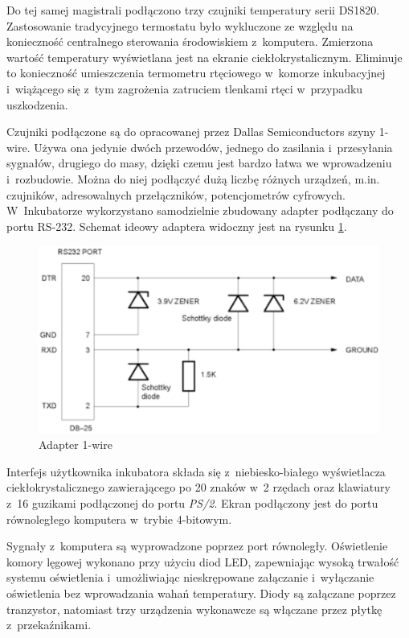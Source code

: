 Do tej samej magistrali podłączono trzy czujniki temperatury serii DS1820.
Zastosowanie tradycyjnego termostatu było wykluczone ze względu na konieczność
centralnego sterowania środowiskiem z~komputera. Zmierzona wartość temperatury
wyświetlana jest na ekranie ciekłokrystalicznym. Eliminuje to konieczność
umieszczenia termometru rtęciowego w~komorze inkubacyjnej i~wiążącego się z~tym
zagrożenia zatruciem tlenkami rtęci w~przypadku uszkodzenia.

Czujniki podłączone są do opracowanej przez Dallas Semiconductors szyny 1-wire.
Używa ona jedynie dwóch przewodów, jednego do zasilania i~przesyłania sygnałów,
drugiego do masy, dzięki czemu jest bardzo łatwa we wprowadzeniu i~rozbudowie.
Można do niej podłączyć dużą liczbę różnych urządzeń, m.in. czujników,
adresowalnych przełączników, potencjometrów cyfrowych. W~Inkubatorze
wykorzystano samodzielnie zbudowany adapter podłączany do portu RS-232. 
Schemat ideowy adaptera widoczny jest na rysunku \ref{rys:Adapter}.

\begin{figure}[t] 
\centering\includegraphics[width=\textwidth]{figures/adapter}
\caption{Adapter 1-wire}\label{rys:Adapter}
\end{figure}

Interfejs użytkownika inkubatora składa się z~niebiesko-białego wyświetlacza
ciekłokrystalicznego zawierającego po 20 znaków w~2 rzędach
oraz klawiatury z~16 guzikami podłączonej do portu \emph{PS/2}. Ekran podłączony
jest do portu równoległego komputera w~trybie 4-bitowym.

Sygnały z~komputera są wyprowadzone poprzez port równoległy. Oświetlenie komory
lęgowej wykonano przy użyciu diod LED, zapewniając wysoką trwałość systemu
oświetlenia i~umożliwiając nieskrępowane załączanie i~wyłączanie oświetlenia bez
wprowadzania wahań temperatury. Diody są załączane poprzez tranzystor, natomiast trzy
urządzenia wykonawcze są włączane przez płytkę z~przekaźnikami.

